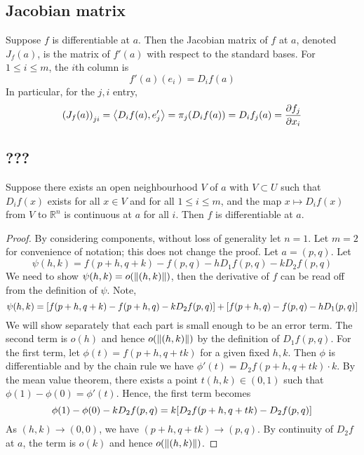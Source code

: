 \subsection{Jacobian matrix}
\begin{definition}
	Suppose \( f \) is differentiable at \( a \).
	Then the Jacobian matrix of \( f \) at \( a \), denoted \( J_f(a) \), is the matrix of \( f'(a) \) with respect to the standard bases.
	For \( 1 \leq i \leq m \), the \( i \)th column is
	\[
		f'(a)(e_i) = D_i f(a)
	\]
	In particular, for the \( j,i \) entry,
	\[
		\qty(J_f(a))_{ji} = \left\langle{D_i f(a), e_j'}\right\rangle = \pi_j\qty(D_i f(a)) = D_i f_j(a) = \pdv{f_j}{x_i}(a)
	\]
\end{definition}

\subsection{???}
\begin{theorem}
	Suppose there exists an open neighbourhood \( V \) of \( a \) with \( V \subset U \) such that \( D_i f(x) \) exists for all \( x \in V \) and for all \( 1 \leq i \leq m \), and the map \( x \mapsto D_i f(x) \) from \( V \) to \( \mathbb R^n \) is continuous at \( a \) for all \( i \).
	Then \( f \) is differentiable at \( a \).
\end{theorem}
\begin{proof}
	By considering components, without loss of generality let \( n = 1 \).
	Let \( m = 2 \) for convenience of notation; this does not change the proof.
	Let \( a = (p,q) \).
	Let
	\[
		\psi(h,k) = f(p+h, q+k) - f(p,q) - h D_1 f(p,q) - k D_2 f(p,q)
	\]
	We need to show \( \psi(h,k) = o\qty(\norm{(h,k)}) \), then the derivative of \( f \) can be read off from the definition of \( \psi \).
	Note,
	\[
		\psi(h,k) = \qty[f(p+h, q+k) - f(p+h, q) - k D_2 f(p,q)] + \qty[f(p+h,q) - f(p,q) - h D_1(p,q)]
	\]
	We will show separately that each part is small enough to be an error term.
	The second term is \( o(h) \) and hence \( o\qty(\norm{(h,k)}) \) by the definition of \( D_1 f(p,q) \).
	For the first term, let \( \phi(t) = f(p+h, q+tk) \) for a given fixed \( h,k \).
	Then \( \phi \) is differentiable and by the chain rule we have \( \phi'(t) = D_2 f(p+h, q+tk) \cdot k \).
	By the mean value theorem, there exists a point \( t(h,k) \in (0,1) \) such that \( \phi(1) - \phi(0) = \phi'(t) \).
	Hence, the first term becomes
	\[
		\phi(1) - \phi(0) - k D_2 f(p,q) = k \qty[ D_2 f(p + h, q + tk) - D_2 f(p,q) ]
	\]
	As \( (h,k) \to (0,0) \), we have \( (p+h, q + tk) \to (p,q) \).
	By continuity of \( D_2 f \) at \( a \), the term is \( o(k) \) and hence \( o\qty(\norm{(h,k)}) \).
\end{proof}


